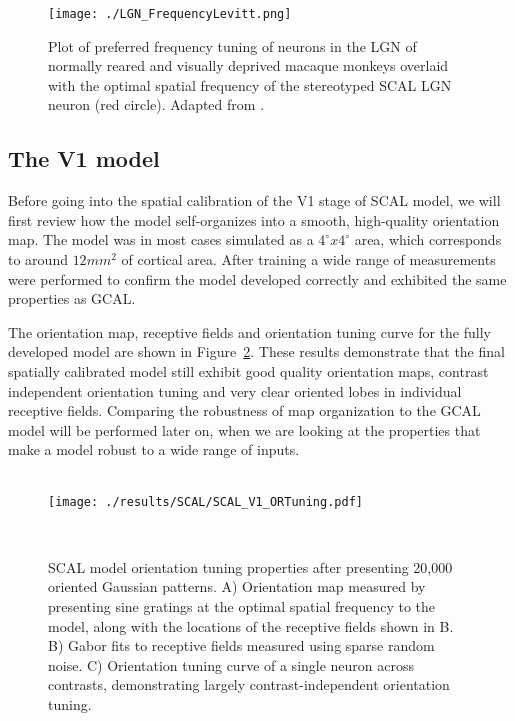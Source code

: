 \begin{figure}
	\centering
    \texttt{[image: ./LGN\_FrequencyLevitt.png]}
	\caption[Spatial frequency preference in SCAL compared to
      experiment. Adapted from \cite{Levitt2001}.]{Plot of preferred
      frequency tuning of neurons in the LGN of normally reared and
      visually deprived macaque monkeys overlaid with the optimal
      spatial frequency of the stereotyped SCAL LGN neuron (red
      circle). Adapted from \cite{Levitt2001}.}
	\label{LGNFrequencyLevitt}
\end{figure}

\subsection{The V1 model}

Before going into the spatial calibration of the V1 stage of SCAL
model, we will first review how the model self-organizes into a
smooth, high-quality orientation map. The model was in most cases
simulated as a $4^\circ x 4^\circ$ area, which corresponds to around
$12 mm^2$ of cortical area. After training a wide range of
measurements were performed to confirm the model developed correctly
and exhibited the same properties as GCAL.

The orientation map, receptive fields and orientation tuning curve for
the fully developed model are shown in
Figure~\ref{SCALORTuning}. These results demonstrate that the final
spatially calibrated model still exhibit good quality orientation
maps, contrast independent orientation tuning and very clear oriented
lobes in individual receptive fields. Comparing the robustness of map
organization to the GCAL model will be performed later on, when we are
looking at the properties that make a model robust to a wide range of
inputs.

\begin{figure}
  \begin{minipage}[t]{0.67\textwidth}
    \mbox{}\\[-\baselineskip]
    \texttt{[image: ./results/SCAL/SCAL\_V1\_ORTuning.pdf]}
  \end{minipage}\hfill
  \begin{minipage}[t]{0.3\textwidth}
    \mbox{}\\[-\baselineskip]
    \caption[Orientation tuning properties of the SCAL model.]{SCAL
      model orientation tuning properties after presenting 20,000
      oriented Gaussian patterns. A) Orientation map measured by
      presenting sine gratings at the optimal spatial frequency to the
      model, along with the locations of the receptive fields shown in
      B. B) Gabor fits to receptive fields measured using sparse
      random noise. C) Orientation tuning curve of a single neuron
      across contrasts, demonstrating largely contrast-independent
      orientation tuning.}
    \label{SCALORTuning}
  \end{minipage}
\end{figure}

